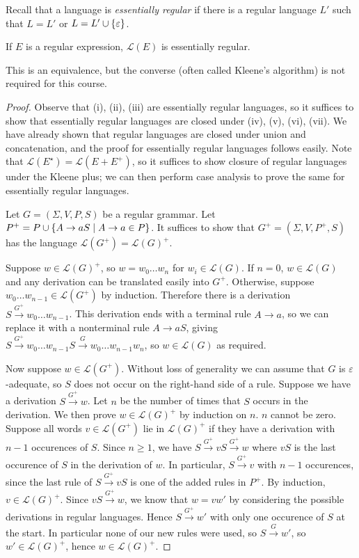 Recall that a language is \emph{essentially regular} if there is a regular language \( L' \) such that \( L = L' \) or \( L = L' \cup \qty{\varepsilon} \).
\begin{theorem}
	If \( E \) is a regular expression, \( \mathcal L(E) \) is essentially regular.
\end{theorem}
This is an equivalence, but the converse (often called Kleene's algorithm) is not required for this course.
\begin{proof}
	Observe that (i), (ii), (iii) are essentially regular languages, so it suffices to show that essentially regular languages are closed under (iv), (v), (vi), (vii).
	We have already shown that regular languages are closed under union and concatenation, and the proof for essentially regular languages follows easily.
	Note that \( \mathcal L(E^\star) = \mathcal L(E + E^+) \), so it suffices to show closure of regular languages under the Kleene plus; we can then perform case analysis to prove the same for essentially regular languages.

	Let \( G = (\Sigma, V, P, S) \) be a regular grammar.
	Let \( P^+ = P \cup \qty{A \to aS \mid A \to a \in P} \).
	It suffices to show that \( G^+ = (\Sigma, V, P^+, S) \) has the language \( \mathcal L(G^+) = \mathcal L(G)^+ \).

	Suppose \( w \in \mathcal L(G)^+ \), so \( w = w_0 \dots w_n \) for \( w_i \in \mathcal L(G) \).
	If \( n = 0 \), \( w \in \mathcal L(G) \) and any derivation can be translated easily into \( G^+ \).
	Otherwise, suppose \( w_0 \dots w_{n-1} \in \mathcal L(G^+) \) by induction.
	Therefore there is a derivation \( S \xrightarrow{G^+} w_0 \dots w_{n-1} \).
	This derivation ends with a terminal rule \( A \to a \), so we can replace it with a nonterminal rule \( A \to aS \), giving \( S \xrightarrow{G^+} w_0 \dots w_{n-1} S \xrightarrow{G} w_0 \dots w_{n-1} w_n \), so \( w \in \mathcal L(G) \) as required.

	Now suppose \( w \in \mathcal L(G^+) \).
	Without loss of generality we can assume that \( G \) is \( \varepsilon \)-adequate, so \( S \) does not occur on the right-hand side of a rule.
	Suppose we have a derivation \( S \xrightarrow{G^+} w \).
	Let \( n \) be the number of times that \( S \) occurs in the derivation.
	We then prove \( w \in \mathcal L(G)^+ \) by induction on \( n \).
	\( n \) cannot be zero.
	Suppose all words \( v \in \mathcal L(G^+) \) lie in \( \mathcal L(G)^+ \) if they have a derivation with \( n-1 \) occurences of \( S \).
	Since \( n \geq 1 \), we have \( S \xrightarrow{G^+} vS \xrightarrow{G^+} w \) where \( vS \) is the last occurence of \( S \) in the derivation of \( w \).
	In particular, \( S \xrightarrow{G^+} v \) with \( n - 1 \) occurences, since the last rule of \( S \xrightarrow{G^+} vS \) is one of the added rules in \( P^+ \).
	By induction, \( v \in \mathcal L(G)^+ \).
	Since \( vS \xrightarrow{G^+} w \), we know that \( w = vw' \) by considering the possible derivations in regular languages.
	Hence \( S \xrightarrow{G^+} w' \) with only one occurence of \( S \) at the start.
	In particular none of our new rules were used, so \( S \xrightarrow G w' \), so \( w' \in \mathcal L(G)^+ \), hence \( w \in \mathcal L(G)^+ \).
\end{proof}

